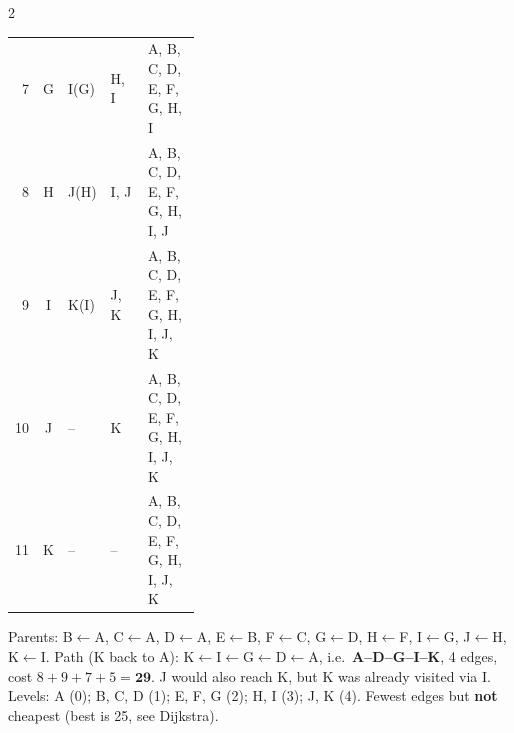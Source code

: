 \begin{multicols}{2}
\begin{worked}
\begin{tabularx}{\linewidth}{@{}rc>{\raggedright\arraybackslash}p{0.17\linewidth}>{\raggedright\arraybackslash}p{0.2\linewidth}X@{}}
7 & G & I(G) & H, I & A, B, C, D, E, F, G, H, I\\
8 & H & J(H) & I, J & A, B, C, D, E, F, G, H, I, J\\
9 & I & K(I) & J, K & A, B, C, D, E, F, G, H, I, J, K\\
10 & J & -- & K & A, B, C, D, E, F, G, H, I, J, K\\
11 & K & -- & -- & A, B, C, D, E, F, G, H, I, J, K\\
\bottomrule\end{tabularx}\par\vspace{2pt}\small
Parents: B$\leftarrow$A, C$\leftarrow$A, D$\leftarrow$A, E$\leftarrow$B, F$\leftarrow$C, G$\leftarrow$D, H$\leftarrow$F, I$\leftarrow$G, J$\leftarrow$H, K$\leftarrow$I. Path (K back to A): K$\leftarrow$I$\leftarrow$G$\leftarrow$D$\leftarrow$A, i.e.\ \textbf{A--D--G--I--K}, 4 edges, cost $8+9+7+5=\mathbf{29}$. J would also reach K, but K was already visited via I. Levels: A (0); B, C, D (1); E, F, G (2); H, I (3); J, K (4). Fewest edges but \textbf{not} cheapest (best is 25, see Dijkstra). \chk
\end{worked}


\end{multicols}
